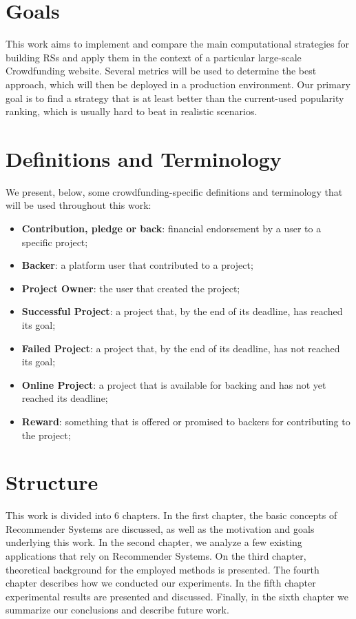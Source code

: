 \documentclass[cic,tc,english]{iiufrgs}
\begin{document}
\section{Goals}
This work aims to implement and compare the main computational strategies for building RSs and apply them in the context of a particular large-scale Crowdfunding website. Several metrics will be used to determine the best approach, which will then be deployed in a production environment. Our primary goal is to find a strategy that is at least better than the current-used popularity ranking, which is usually hard to beat in realistic scenarios.

\section{Definitions and Terminology}

We present, below, some crowdfunding-specific definitions and terminology that will be used throughout this work:
\begin{itemize}
\item \textbf{Contribution, pledge or back}: financial endorsement by a user to a specific project;
\item \textbf{Backer}: a platform user that contributed to a project;
\item \textbf{Project Owner}: the user that created the project;
\item \textbf{Successful Project}: a project that, by the end of its deadline, has reached its goal;
\item \textbf{Failed Project}: a project that, by the end of its deadline, has not reached its goal;
\item \textbf{Online Project}: a project that is available for backing and has not yet reached its deadline;
\item \textbf{Reward}: something that is offered or promised to backers for contributing to the project;
\end{itemize}

\section{Structure}

This work is divided into 6 chapters. In the first chapter, the basic concepts of Recommender Systems are discussed, as well as the motivation and goals underlying this work. In the second chapter, we analyze a few existing applications that rely on Recommender Systems. On the third chapter, theoretical background for the employed methods is presented. The fourth chapter describes how we conducted our experiments. In the fifth chapter experimental results are presented and discussed. Finally, in the sixth chapter we summarize our conclusions and describe future work.
\end{document}
